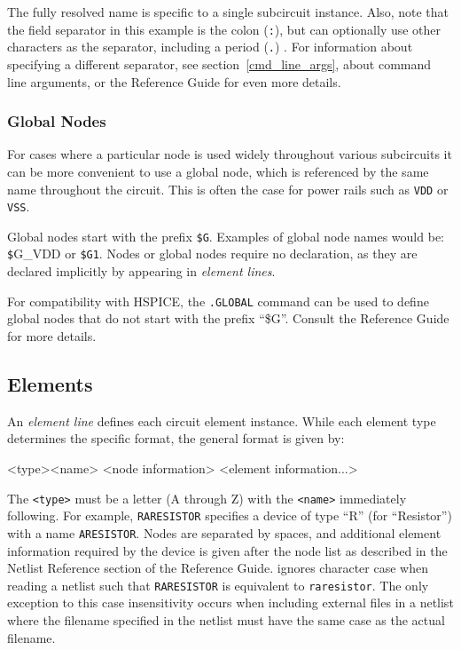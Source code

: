 The fully resolved name is specific to a single subcircuit instance.  
Also, note that the field separator in this example is the colon (\texttt{:}), but \Xyce{} can 
optionally use other characters as the separator, including a period (\texttt{.}) .  
For information about specifying a different separator, see section~\ref{cmd_line_args}, 
about \Xyce{} command line arguments, or the \Xyce{} Reference Guide\ReferenceGuide{} 
for even more details.

\subsubsection{Global Nodes}
For cases where a particular node is used widely throughout various
subcircuits it can be more convenient to use a global node, which is
referenced by the same name throughout the circuit.  This is often the
case for power rails such as \texttt{VDD} or \texttt{VSS}.

Global nodes start with the prefix \texttt{\$G}.  Examples of global node names would be:
{\texttt \$G\_VDD} or \texttt{\$G1}.  Nodes or global nodes require no declaration, as they are declared implicitly by appearing in \emph{element lines\/}.

For compatibility with HSPICE, the \texttt{.GLOBAL} command can be 
used to define global nodes that do not start with the prefix ``\$G''.
Consult the \Xyce{} Reference Guide\ReferenceGuide{} for more details. 

\subsection{Elements}

An \emph{element line\/} defines each circuit element instance. While each element type determines the specific format, the general format is given by:
\begin{vquote}
<type><name> <node information> <element information...>
\end{vquote}
The \texttt{<type>} must be a letter (A through Z) with the
\texttt{<name>} immediately following.  For example, \texttt{RARESISTOR}
specifies a device of type ``R'' (for ``Resistor'') with a name
\texttt{ARESISTOR}.  Nodes are separated by spaces, and additional
element information required by the device is given after the node
list as described in the Netlist Reference section of the \Xyce{}
Reference Guide\ReferenceGuide{}.
\Xyce{} ignores character case when reading 
a netlist such that \texttt{RARESISTOR} is equivalent to \texttt{raresistor}.  The 
only exception to this case insensitivity occurs when including external files in a netlist  where 
the filename specified in the netlist must have the same case as the actual filename.

